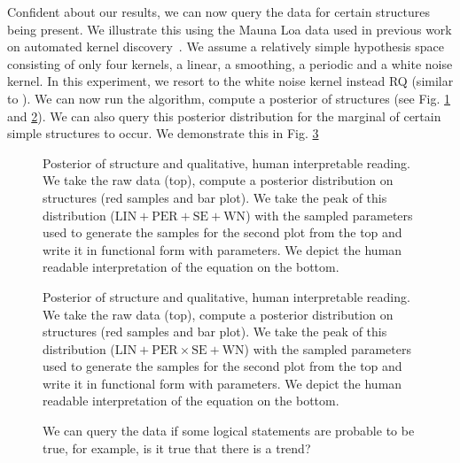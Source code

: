 Confident about our results, we can now query the data for certain structures being present. We illustrate this using the Mauna Loa data used in previous work on automated kernel discovery~\citep{duvenaud2013structure}. We assume a relatively simple hypothesis space  consisting of only four kernels, a linear, a smoothing, a periodic and a white noise kernel. In this experiment, we resort to the white noise kernel instead RQ (similar to \citep{lloyd2014automatic}).  We can now run the algorithm, compute a posterior of structures (see Fig. \ref{fig:posterior} and \ref{fig:posterior_airline}). We can also query this posterior distribution for the marginal of certain simple structures to occur. We demonstrate this in Fig. \ref{fig:query}
\begin{figure}
\centering

\caption{\small Posterior of structure and qualitative, human interpretable reading. We take the raw data (top), compute a posterior distribution on structures (red samples and bar plot).
We take the peak of this distribution ($\text{LIN}+\text{PER}+\text{SE}+\text{WN}$) with the sampled parameters used to generate the samples for the second plot from the top and write it in functional form with parameters. We depict the human readable interpretation of the equation on the bottom.}\label{fig:posterior}
\end{figure}

\begin{figure}
\centering

\caption{\small Posterior of structure and qualitative, human interpretable reading. We take the raw data (top), compute a posterior distribution on structures (red samples and bar plot).
We take the peak of this distribution ($\text{LIN}+\text{PER} \times \text{SE}+\text{WN}$) with the sampled parameters used to generate the samples for the second plot from the top and write it in functional form with parameters. We depict the human readable interpretation of the equation on the bottom.}\label{fig:posterior_airline}
\end{figure}

\begin{figure}
\centering

\caption{We can query the data if some logical statements are probable to be true, for example, is it true that there is a trend?}\label{fig:query}
\end{figure}